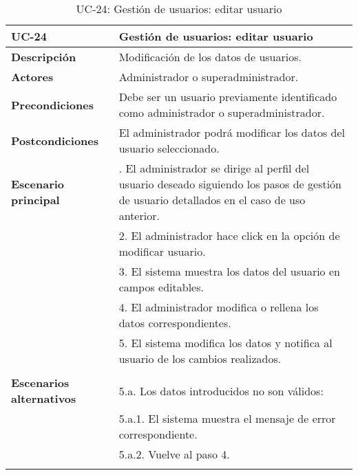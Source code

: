 \begin{table}[H]
  \begin{center}
    \begin{tabularx}{16.4cm}{|l|X|}
      \hline
      \textbf{UC-24} & \textbf{Gestión de usuarios: editar usuario}\\
      \hline
      \textbf{Descripción} & Modificación de los datos de usuarios.\\
      \hline
      \textbf{Actores} & Administrador o superadministrador.\\
      \hline
      \textbf{Precondiciones} & Debe ser un usuario previamente identificado como administrador o superadministrador.\\
      \hline
      \textbf{Postcondiciones} & El administrador podrá modificar los datos del usuario seleccionado.\\
      \hline
      \textbf{Escenario principal} & \smallskip 1. El administrador se dirige al perfil del usuario deseado siguiendo los pasos de gestión de usuario detallados en el caso de uso anterior.\\
      & 2. El administrador hace click en la opción de modificar usuario. \\
      & 3. El sistema muestra los datos del usuario en campos editables.\\
      & 4. El administrador modifica o rellena los datos correspondientes.\\
      & 5. El sistema modifica los datos y notifica al usuario de los cambios realizados.\\ 
      & \\
      \hline
      \textbf{Escenarios alternativos} & \smallskip 5.a. Los datos introducidos no son válidos:\\
      & \hspace{0.3cm} 5.a.1. El sistema muestra el mensaje de error correspondiente.\\
      & \hspace{0.3cm} 5.a.2. Vuelve al paso 4.\\
      & \\
      \hline
    \end{tabularx}
    \caption{UC-24: Gestión de usuarios: editar usuario}
  \end{center}
\end{table}


